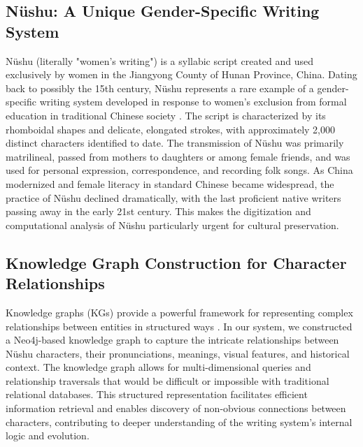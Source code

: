 \documentclass{article}
\begin{document}
\subsection{N\"{u}shu: A Unique Gender-Specific Writing System}
\label{ssec:nushu}
    N\"{u}shu (literally "women's writing") is a syllabic script created and used exclusively by women in the Jiangyong County of Hunan Province, China. Dating back to possibly the 15th century, N\"{u}shu represents a rare example of a gender-specific writing system developed in response to women's exclusion from formal education in traditional Chinese society \cite{chen2006nuhanzi}. The script is characterized by its rhomboidal shapes and delicate, elongated strokes, with approximately 2,000 distinct characters identified to date.
    The transmission of N\"{u}shu was primarily matrilineal, passed from mothers to daughters or among female friends, and was used for personal expression, correspondence, and recording folk songs. As China modernized and female literacy in standard Chinese became widespread, the practice of N\"{u}shu declined dramatically, with the last proficient native writers passing away in the early 21st century. This makes the digitization and computational analysis of N\"{u}shu particularly urgent for cultural preservation.

\subsection{Knowledge Graph Construction for Character Relationships}
\label{ssec:kg_intro}
    Knowledge graphs (KGs) provide a powerful framework for representing complex relationships between entities in structured ways \cite{hoganKnowledgeGraphs2022}. In our system, we constructed a Neo4j-based knowledge graph to capture the intricate relationships between N\"{u}shu characters, their pronunciations, meanings, visual features, and historical context.
    The knowledge graph allows for multi-dimensional queries and relationship traversals that would be difficult or impossible with traditional relational databases. This structured representation facilitates efficient information retrieval and enables discovery of non-obvious connections between characters, contributing to deeper understanding of the writing system's internal logic and evolution.
\end{document}
